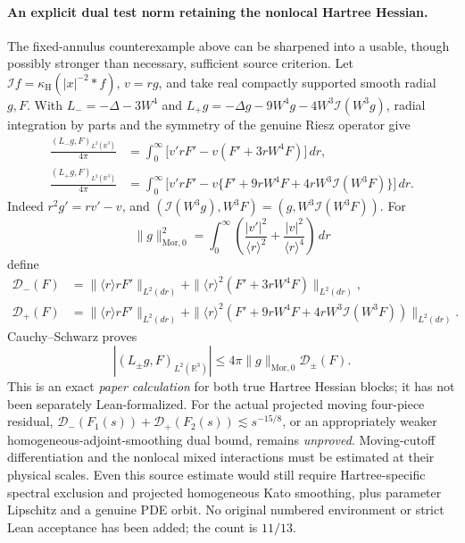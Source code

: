 \documentclass[11pt]{amsart}
\begin{document}
\paragraph{An explicit dual test norm retaining the nonlocal Hartree Hessian.}
The fixed-annulus counterexample above can be sharpened into a usable,
though possibly stronger than necessary, sufficient source criterion.
Let \(\mathcal If=\kappa_{\mathrm H}(|x|^{-2}*f)\),
\(v=rg\), and take real compactly supported smooth radial \(g,F\).
With \(L_-=-\Delta-3W^4\) and
\(L_+g=-\Delta g-9W^4g-4W^3\mathcal I(W^3g)\),
radial integration by parts and the symmetry of the genuine Riesz
operator give
\[
\begin{aligned}
 \frac{(L_-g,F)_{L^2(\mathbb R^3)}}{4\pi}
 &=\int_0^\infty
     \bigl[v'rF'-v(F'+3rW^4F)\bigr]\,dr,\\
 \frac{(L_+g,F)_{L^2(\mathbb R^3)}}{4\pi}
 &=\int_0^\infty
   \bigl[v'rF'-v\{F'+9rW^4F+
                4rW^3\mathcal I(W^3F)\}\bigr]\,dr.
\end{aligned}
\]
Indeed \(r^2g'=rv'-v\), and
\((\mathcal I(W^3g),W^3F)=(g,W^3\mathcal I(W^3F))\).
For
\[
\|g\|_{\mathrm{Mor},0}^{2}
=\int_0^\infty
\left(\frac{|v'|^2}{\langle r\rangle^2}
      +\frac{|v|^2}{\langle r\rangle^4}\right)\,dr
\]
define
\[
\begin{aligned}
\mathcal D_-(F)
 &=\|\langle r\rangle rF'\|_{L^2(dr)}
  +\|\langle r\rangle^2(F'+3rW^4F)\|_{L^2(dr)},\\
\mathcal D_+(F)
 &=\|\langle r\rangle rF'\|_{L^2(dr)}
  +\|\langle r\rangle^2(F'+9rW^4F+
             4rW^3\mathcal I(W^3F))\|_{L^2(dr)}.
\end{aligned}
\]
Cauchy--Schwarz proves
\[
 |(L_\pm g,F)_{L^2(\mathbb R^3)}|
 \le 4\pi\|g\|_{\mathrm{Mor},0}\mathcal D_\pm(F).
\]
This is an exact \emph{paper calculation} for both true Hartree
Hessian blocks; it has not been separately Lean-formalized.
For the actual projected moving four-piece residual,
\(\mathcal D_-(F_1(s))+\mathcal D_+(F_2(s))
\lesssim s^{-15/8}\), or an appropriately weaker
homogeneous-adjoint-smoothing dual bound, remains
\emph{unproved}. Moving-cutoff differentiation and the
nonlocal mixed interactions must be estimated at their
physical scales. Even this source estimate would still
require Hartree-specific spectral exclusion and projected
homogeneous Kato smoothing, plus parameter Lipschitz and
a genuine PDE orbit. No original numbered environment or
strict Lean acceptance has been added; the count is \(11/13\).
\end{document}
